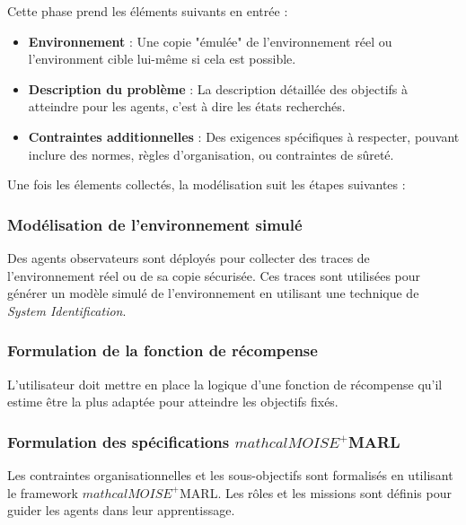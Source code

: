 \documentclass[sigconf,anonymous]{aamas}
\begin{document}
Cette phase prend les éléments suivants en entrée :
\begin{itemize}
    \item \textbf{Environnement} : Une copie "émulée" de l'environnement réel ou l'environment cible lui-même si cela est possible.
    \item \textbf{Description du problème} : La description détaillée des objectifs à atteindre pour les agents, c'est à dire les états recherchés.
    \item \textbf{Contraintes additionnelles} : Des exigences spécifiques à respecter, pouvant inclure des normes, règles d'organisation, ou contraintes de sûreté.
\end{itemize}

Une fois les élements collectés, la modélisation suit les étapes suivantes :

\subsubsection{Modélisation de l'environnement simulé}
  
Des agents observateurs sont déployés pour collecter des traces de l'environnement réel ou de sa copie sécurisée. Ces traces sont utilisées pour générer un modèle simulé de l'environnement en utilisant une technique de \textit{System Identification}.

\subsubsection{Formulation de la fonction de récompense}

L'utilisateur doit mettre en place la logique d'une fonction de récompense qu'il estime être la plus adaptée pour atteindre les objectifs fixés. 

\subsubsection{Formulation des spécifications $mathcal{M}OISE^+$MARL}

Les contraintes organisationnelles et les sous-objectifs sont formalisés en utilisant le framework $mathcal{M}OISE^+$MARL. Les rôles et les missions sont définis pour guider les agents dans leur apprentissage.




\end{document}
